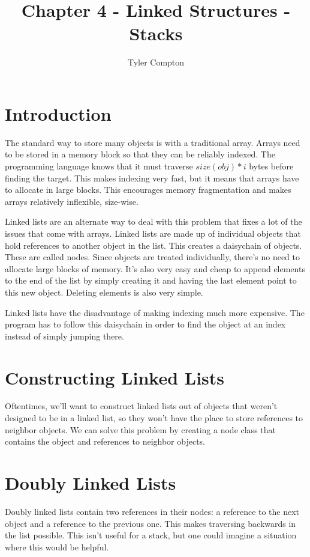 \documentclass{article}
\author{Tyler Compton}
\title{Chapter 4 - Linked Structures - Stacks}
\begin{document}
\maketitle
\tableofcontents

\section{Introduction}
The standard way to store many objects is with a traditional array. Arrays need
to be stored in a memory block so that they can be reliably indexed. The
programming language knows that it must traverse $size(obj)*i$ bytes before
finding the target. This makes indexing very fast, but it means that arrays
have to allocate in large blocks. This encourages memory fragmentation and
makes arrays relatively inflexible, size-wise.

Linked lists are an alternate way to deal with this problem that fixes a lot of
the issues that come with arrays. Linked lists are made up of individual
objects that hold references to another object in the list. This creates a
daisychain of objects. These are called nodes. Since objects are treated
individually, there's no need to allocate large blocks of memory. It's also very
easy and cheap to append elements to the end of the list by simply creating it
and having the last element point to this new object. Deleting elements is also
very simple.

Linked lists have the disadvantage of making indexing much more expensive. The
program has to follow this daisychain in order to find the object at an index
instead of simply jumping there.

\section{Constructing Linked Lists}
Oftentimes, we'll want to construct linked lists out of objects that weren't
designed to be in a linked list, so they won't have the place to store
references to neighbor objects. We can solve this problem by creating a node
class that contains the object and references to neighbor objects.

\section{Doubly Linked Lists}
Doubly linked lists contain two references in their nodes: a reference to the
next object and a reference to the previous one. This makes traversing
backwards in the list possible. This isn't useful for a stack, but one could
imagine a situation where this would be helpful.
\end{document}

